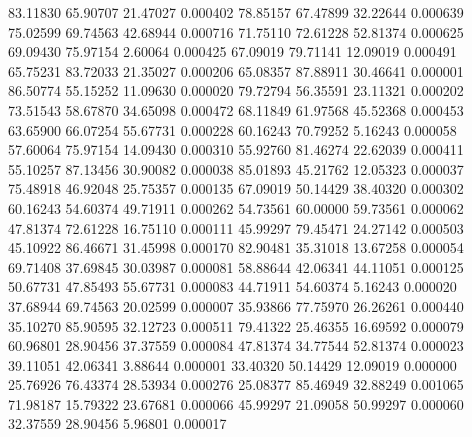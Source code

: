        83.11830       65.90707       21.47027       0.000402
       78.85157       67.47899       32.22644       0.000639
       75.02599       69.74563       42.68944       0.000716
       71.75110       72.61228       52.81374       0.000625
       69.09430       75.97154        2.60064       0.000425
       67.09019       79.71141       12.09019       0.000491
       65.75231       83.72033       21.35027       0.000206
       65.08357       87.88911       30.46641       0.000001
       86.50774       55.15252       11.09630       0.000020
       79.72794       56.35591       23.11321       0.000202
       73.51543       58.67870       34.65098       0.000472
       68.11849       61.97568       45.52368       0.000453
       63.65900       66.07254       55.67731       0.000228
       60.16243       70.79252        5.16243       0.000058
       57.60064       75.97154       14.09430       0.000310
       55.92760       81.46274       22.62039       0.000411
       55.10257       87.13456       30.90082       0.000038
       85.01893       45.21762       12.05323       0.000037
       75.48918       46.92048       25.75357       0.000135
       67.09019       50.14429       38.40320       0.000302
       60.16243       54.60374       49.71911       0.000262
       54.73561       60.00000       59.73561       0.000062
       47.81374       72.61228       16.75110       0.000111
       45.99297       79.45471       24.27142       0.000503
       45.10922       86.46671       31.45998       0.000170
       82.90481       35.31018       13.67258       0.000054
       69.71408       37.69845       30.03987       0.000081
       58.88644       42.06341       44.11051       0.000125
       50.67731       47.85493       55.67731       0.000083
       44.71911       54.60374        5.16243       0.000020
       37.68944       69.74563       20.02599       0.000007
       35.93866       77.75970       26.26261       0.000440
       35.10270       85.90595       32.12723       0.000511
       79.41322       25.46355       16.69592       0.000079
       60.96801       28.90456       37.37559       0.000084
       47.81374       34.77544       52.81374       0.000023
       39.11051       42.06341        3.88644       0.000001
       33.40320       50.14429       12.09019       0.000000
       25.76926       76.43374       28.53934       0.000276
       25.08377       85.46949       32.88249       0.001065
       71.98187       15.79322       23.67681       0.000066
       45.99297       21.09058       50.99297       0.000060
       32.37559       28.90456        5.96801       0.000017
